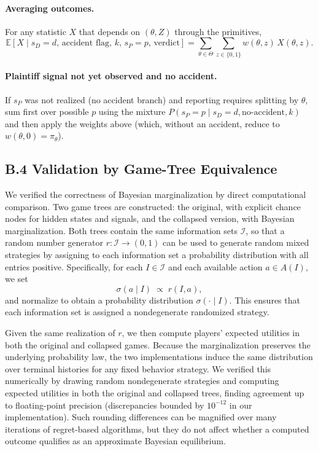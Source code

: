 \documentclass{article}
\begin{document}
\paragraph{Averaging outcomes.}
For any statistic $X$ that depends on $(\theta,Z)$ through the primitives,
\[
\mathbb{E}\!\left[X \mid s_D=d,\,\text{accident flag},\,k,\,s_P=p,\,\text{verdict}\right]
=\sum_{\theta\in\Theta}\sum_{z\in\{0,1\}} w(\theta,z)\,X(\theta,z).
\]

\paragraph{Plaintiff signal not yet observed and no accident.}
If $s_P$ was not realized (no accident branch) and reporting requires splitting by $\theta$, sum first over possible $p$ using the mixture $P(s_P=p\mid s_D=d,\text{no-accident},k)$ and then apply the weights above (which, without an accident, reduce to $w(\theta,0)=\pi_\theta$).

\subsection*{B.4 Validation by Game-Tree Equivalence}

We verified the correctness of Bayesian marginalization by direct computational comparison. Two game trees are constructed: the original, with explicit chance nodes for hidden states and signals, and the collapsed version, with Bayesian marginalization. Both trees contain the same information sets $\mathcal{I}$, so that a random number generator $r:\mathcal{I}\to(0,1)$ can be used to generate random mixed strategies by assigning to each information set a probability distribution with all entries positive. Specifically, for each $I\in \mathcal{I}$ and each available action $a\in A(I)$, we set
\[
\sigma(a\mid I) \;\propto\; r(I,a),
\]
and normalize to obtain a probability distribution $\sigma(\cdot\mid I)$. This ensures that each information set is assigned a nondegenerate randomized strategy.

Given the same realization of $r$, we then compute players’ expected utilities in both the original and collapsed games. Because the marginalization preserves the underlying probability law, the two implementations induce the same distribution over terminal histories for any fixed behavior strategy. We verified this numerically by drawing random nondegenerate strategies and computing expected utilities in both the original and collapsed trees, finding agreement up to floating-point precision (discrepancies bounded by $10^{-12}$ in our implementation). Such rounding differences can be magnified over many iterations of regret-based algorithms, but they do not affect whether a computed outcome qualifies as an approximate Bayesian equilibrium.
\end{document}
